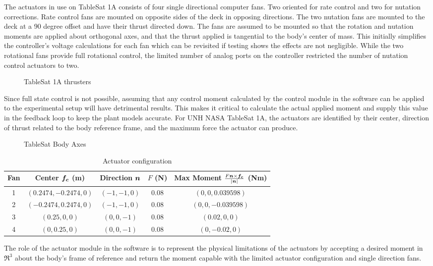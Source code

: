 The actuators in use on TableSat 1A consists of four single directional computer fans.  Two oriented for rate control and two for nutation corrections.  Rate control fans are mounted on opposite sides of the deck in opposing directions.  The two nutation fans are mounted to the deck at a 90 degree offset and have their thrust directed down.  The fans are assumed to be mounted so that the rotation and nutation moments are applied about orthogonal axes, and that the thrust applied is tangential to the body's center of mass.  This initially simplifies the controller's voltage calculations for each fan which can be revisited if testing shows the effects are not negligible.  While the two rotational fans provide full rotational control, the limited number of analog ports on the controller restricted the number of nutation control actuators to two.
\begin{figure}[H]
  \centerline{}
  \caption{TableSat 1A thrusters}
  \label{fig:TSatThrusters}
\end{figure}
Since full state control is not possible, assuming that any control moment calculated by the control module in the software can be applied to the experimental setup will have detrimental results.  This makes it critical to calculate the actual applied moment and supply this value in the feedback loop to keep the plant models accurate.  For UNH NASA TableSat 1A, the actuators are identified by their center, direction of thrust related to the body reference frame, and the maximum force the actuator can produce.
\begin{figure}[H]
  \centerline{}
  \caption{TableSat Body Axes}
  \label{fig:TableSatBodyAxes}
\end{figure}
\begin{table}[H]
  \centering
  \begin{tabular}{c|c|c|c|c}
    Fan & Center $\boldsymbol{f_c}$ (m) & Direction $\boldsymbol{n}$ & $F$ (N) & Max Moment $\frac{F \boldsymbol{n} \times \boldsymbol{f_c}}{|\boldsymbol{n}|}$ (Nm) \\ \hline
    1 & $(0.2474, -0.2474, 0)$ & $(-1, -1, 0)$ & 0.08 & $(0, 0, 0.039598)$ \\
    2 & $(-0.2474, 0.2474, 0)$ & $(-1, -1, 0)$ & 0.08 & $(0, 0, -0.039598)$ \\
    3 & $(0.25, 0, 0)$ & $(0, 0, -1)$ & 0.08 & $(0.02, 0, 0)$ \\
    4 & $(0, 0.25, 0)$ & $(0, 0, -1)$ & 0.08 & $(0, -0.02, 0)$ \\
  \end{tabular}
  \caption{Actuator configuration}
  \label{tbl:ActuatorConfiguration}
\end{table}
The role of the actuator module in the software is to represent the physical limitations of the actuators by accepting a desired moment in $\Re^3$ about the body's frame of reference and return the moment capable with the limited actuator configuration and single direction fans.

